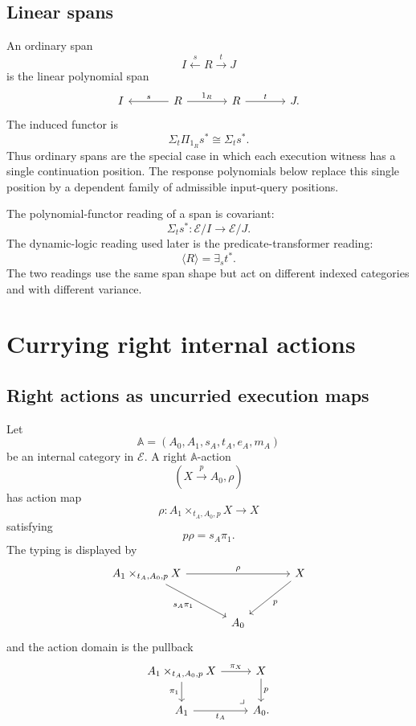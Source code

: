 \subsection{Linear spans}
\label{subsec:poly-relative-linear-spans}

\begin{remark}
\label{rem:poly-relative-linear-spans}
An ordinary span
\[
I\xleftarrow{s}R\xrightarrow{t}J
\]
is the linear polynomial span
\[
\begin{tikzcd}[column sep=large]
I
&
R
  \arrow[l,"s"']
  \arrow[r,"1_R"]
&
R
  \arrow[r,"t"]
&
J.
\end{tikzcd}
\]
The induced functor is
\[
\Sigma_t\Pi_{1_R}s^\ast
\cong
\Sigma_t s^\ast.
\]
Thus ordinary spans are the special case in which each execution witness has a
single continuation position.  The response polynomials below replace this
single position by a dependent family of admissible input-query positions.
\end{remark}

The polynomial-functor reading of a span is covariant:
\[
\Sigma_t s^\ast:\mathcal E/I\to\mathcal E/J.
\]
The dynamic-logic reading used later is the predicate-transformer reading:
\[
\langle R\rangle=\exists_s t^\ast.
\]
The two readings use the same span shape but act on different indexed
categories and with different variance.

\section{Currying right internal actions}
\label{sec:poly-relative-currying-actions}

\subsection{Right actions as uncurried execution maps}
\label{subsec:poly-relative-actions-uncurried}

Let
\[
\mathbb A=(A_0,A_1,s_A,t_A,e_A,m_A)
\]
be an internal category in \(\mathcal E\).  A right \(\mathbb A\)-action
\[
(X\xrightarrow{p}A_0,\rho)
\]
has action map
\[
\rho:
A_1\times_{t_A,A_0,p}X\to X
\]
satisfying
\[
p\rho=s_A\pi_1.
\]
The typing is displayed by
\[
\begin{tikzcd}[column sep=large,row sep=large]
A_1\times_{t_A,A_0,p}X
  \arrow[rr,"\rho"]
  \arrow[dr,"s_A\pi_1"']
&&
X
  \arrow[dl,"p"]
\\
&
A_0
&
\end{tikzcd}
\]
and the action domain is the pullback
\[
\begin{tikzcd}
A_1\times_{t_A,A_0,p}X
  \arrow[r,"\pi_X"]
  \arrow[d,"\pi_1"']
&
X
  \arrow[d,"p"]
\\
A_1
  \arrow[r,"t_A"']
&
A_0
\arrow[ul,phantom,very near start,"\lrcorner"] .
\end{tikzcd}
\]

